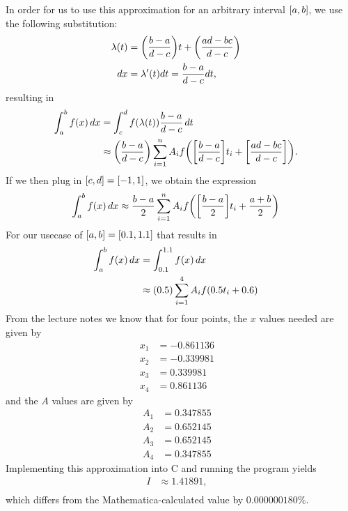 \documentclass[12pt]{article}
\DeclarePairedDelimiter\rb{(}{)}
\DeclarePairedDelimiter\sqrb{[}{]}
\begin{document}
\begin{enumerate}[label=(\alph*)]
    In order for us to use this approximation for an arbitrary interval \(\sqrb*{a,b}\), we use the following substitution:
    \begin{align*}
        \lambda \rb*{t} & = \rb*{\frac{b-a}{d-c}} t + \rb*{\frac{ad - bc}{d -c}} &\\
        dx & = \lambda' \rb*{t} d t 
         = \frac{b-a}{d-c} d t, &\\
    \end{align*}
    resulting in 
    \begin{align*}
        \int_{a}^{b} {f \rb*{x}} \,d x & = \int_{c}^{d} {f \rb*{ \lambda (t)} \frac{b-a}{d-c}} \,d t &\\
        & \approx
        \rb*{\frac{b-a}{d-c}} \sum_{i=1}^{n} {
            A_{i} f \rb*{ \sqrb*{
                    \frac{b-a}{d-c}
            }t_{i} 
        + \sqrb*{\frac{ad-bc}{d-c}}}
        }. &\\
    \end{align*}
    If we then plug in \(\sqrb*{c,d} = \sqrb*{-1,1}\), we obtain the expression
    \begin{align*}
        \int_{a}^{b} {f \rb*{x}} \,d x & \approx
        \frac{b-a}{2} \sum_{i = 1}^{n} {
            A_{i} f \rb*{\sqrb*{\frac{b-a}{2}}t_{i} + \frac{a+b}{2}}
        } &\\
    \end{align*}
    For our usecase of \(\sqrb*{a,b} = \sqrb*{0.1,1.1}\) that results in 
    \begin{align*}
        \int_{a}^{b} {f \rb*{x}} \,d x & = 
        \int_{0.1}^{1.1} {f \rb*{x}} \,d x &\\
         & \approx \rb*{0.5} \sum_{i = 1 }^{4} {A_{i} f \rb*{
                 0.5 t_{i} + 0.6
         }}
    \end{align*}
    From the lecture notes we know that for four points, the \(x\) values needed are given by
    \begin{align*}
        x_{1} & = - 0.861136 &\\
        x_{2} & = - 0.339981 &\\
        x_{3} & =  0.339981 &\\
        x_{4} & =  0.861136
    \end{align*}
    and the \(A\) values are given by 
    \begin{align*}
        A_{1} & = 0.347855 &\\
        A_{2} & = 0.652145 &\\
        A_{3} & = 0.652145 &\\
        A_{4} & = 0.347855 
    \end{align*}
    Implementing this approximation into C and running the program yields
    \begin{align*}
        I & \approx 1.41891 ,&\\
    \end{align*}
    which differs from the Mathematica-calculated value by \(0.000000180 \%\).

\end{enumerate} 
\end{document}
